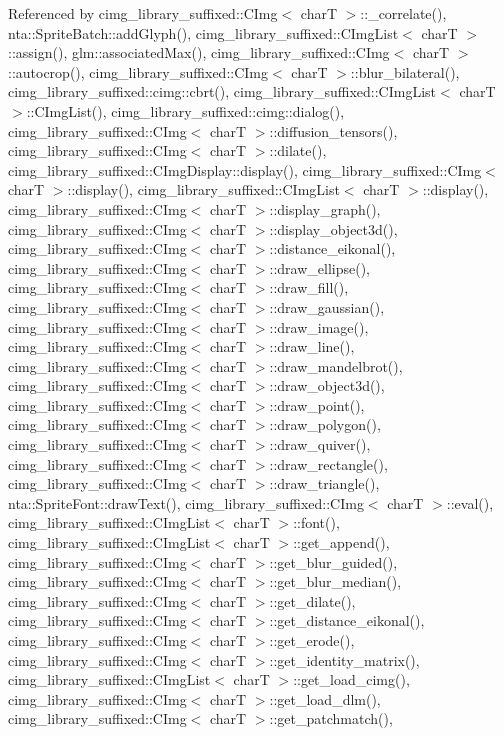 Referenced by cimg\+\_\+library\+\_\+suffixed\+::\+C\+Img$<$ char\+T $>$\+::\+\_\+correlate(), nta\+::\+Sprite\+Batch\+::add\+Glyph(), cimg\+\_\+library\+\_\+suffixed\+::\+C\+Img\+List$<$ char\+T $>$\+::assign(), glm\+::associated\+Max(), cimg\+\_\+library\+\_\+suffixed\+::\+C\+Img$<$ char\+T $>$\+::autocrop(), cimg\+\_\+library\+\_\+suffixed\+::\+C\+Img$<$ char\+T $>$\+::blur\+\_\+bilateral(), cimg\+\_\+library\+\_\+suffixed\+::cimg\+::cbrt(), cimg\+\_\+library\+\_\+suffixed\+::\+C\+Img\+List$<$ char\+T $>$\+::\+C\+Img\+List(), cimg\+\_\+library\+\_\+suffixed\+::cimg\+::dialog(), cimg\+\_\+library\+\_\+suffixed\+::\+C\+Img$<$ char\+T $>$\+::diffusion\+\_\+tensors(), cimg\+\_\+library\+\_\+suffixed\+::\+C\+Img$<$ char\+T $>$\+::dilate(), cimg\+\_\+library\+\_\+suffixed\+::\+C\+Img\+Display\+::display(), cimg\+\_\+library\+\_\+suffixed\+::\+C\+Img$<$ char\+T $>$\+::display(), cimg\+\_\+library\+\_\+suffixed\+::\+C\+Img\+List$<$ char\+T $>$\+::display(), cimg\+\_\+library\+\_\+suffixed\+::\+C\+Img$<$ char\+T $>$\+::display\+\_\+graph(), cimg\+\_\+library\+\_\+suffixed\+::\+C\+Img$<$ char\+T $>$\+::display\+\_\+object3d(), cimg\+\_\+library\+\_\+suffixed\+::\+C\+Img$<$ char\+T $>$\+::distance\+\_\+eikonal(), cimg\+\_\+library\+\_\+suffixed\+::\+C\+Img$<$ char\+T $>$\+::draw\+\_\+ellipse(), cimg\+\_\+library\+\_\+suffixed\+::\+C\+Img$<$ char\+T $>$\+::draw\+\_\+fill(), cimg\+\_\+library\+\_\+suffixed\+::\+C\+Img$<$ char\+T $>$\+::draw\+\_\+gaussian(), cimg\+\_\+library\+\_\+suffixed\+::\+C\+Img$<$ char\+T $>$\+::draw\+\_\+image(), cimg\+\_\+library\+\_\+suffixed\+::\+C\+Img$<$ char\+T $>$\+::draw\+\_\+line(), cimg\+\_\+library\+\_\+suffixed\+::\+C\+Img$<$ char\+T $>$\+::draw\+\_\+mandelbrot(), cimg\+\_\+library\+\_\+suffixed\+::\+C\+Img$<$ char\+T $>$\+::draw\+\_\+object3d(), cimg\+\_\+library\+\_\+suffixed\+::\+C\+Img$<$ char\+T $>$\+::draw\+\_\+point(), cimg\+\_\+library\+\_\+suffixed\+::\+C\+Img$<$ char\+T $>$\+::draw\+\_\+polygon(), cimg\+\_\+library\+\_\+suffixed\+::\+C\+Img$<$ char\+T $>$\+::draw\+\_\+quiver(), cimg\+\_\+library\+\_\+suffixed\+::\+C\+Img$<$ char\+T $>$\+::draw\+\_\+rectangle(), cimg\+\_\+library\+\_\+suffixed\+::\+C\+Img$<$ char\+T $>$\+::draw\+\_\+triangle(), nta\+::\+Sprite\+Font\+::draw\+Text(), cimg\+\_\+library\+\_\+suffixed\+::\+C\+Img$<$ char\+T $>$\+::eval(), cimg\+\_\+library\+\_\+suffixed\+::\+C\+Img\+List$<$ char\+T $>$\+::font(), cimg\+\_\+library\+\_\+suffixed\+::\+C\+Img\+List$<$ char\+T $>$\+::get\+\_\+append(), cimg\+\_\+library\+\_\+suffixed\+::\+C\+Img$<$ char\+T $>$\+::get\+\_\+blur\+\_\+guided(), cimg\+\_\+library\+\_\+suffixed\+::\+C\+Img$<$ char\+T $>$\+::get\+\_\+blur\+\_\+median(), cimg\+\_\+library\+\_\+suffixed\+::\+C\+Img$<$ char\+T $>$\+::get\+\_\+dilate(), cimg\+\_\+library\+\_\+suffixed\+::\+C\+Img$<$ char\+T $>$\+::get\+\_\+distance\+\_\+eikonal(), cimg\+\_\+library\+\_\+suffixed\+::\+C\+Img$<$ char\+T $>$\+::get\+\_\+erode(), cimg\+\_\+library\+\_\+suffixed\+::\+C\+Img$<$ char\+T $>$\+::get\+\_\+identity\+\_\+matrix(), cimg\+\_\+library\+\_\+suffixed\+::\+C\+Img\+List$<$ char\+T $>$\+::get\+\_\+load\+\_\+cimg(), cimg\+\_\+library\+\_\+suffixed\+::\+C\+Img$<$ char\+T $>$\+::get\+\_\+load\+\_\+dlm(), cimg\+\_\+library\+\_\+suffixed\+::\+C\+Img$<$ char\+T $>$\+::get\+\_\+patchmatch(), 